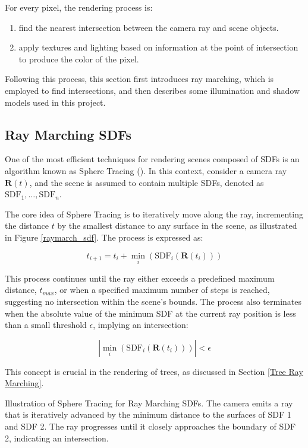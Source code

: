 For every pixel, the rendering process is:
\begin{enumerate}
    \item find the nearest intersection between the camera ray and scene objects.
    \item apply textures and lighting based on information at the point of intersection to produce the color of the pixel.
\end{enumerate}

Following this process, this section first introduces ray marching, which is employed to find intersections, and then describes some illumination and shadow models used in this project.

\subsection{Ray Marching SDFs}
\label{Raymarching SDFs}

One of the most efficient techniques for rendering scenes composed of SDFs is an algorithm known as Sphere Tracing (). In this context, consider a camera ray $\mathbf{R}(t)$, and the scene is assumed to contain multiple SDFs, denoted as $\text{SDF}_1, \dots, \text{SDF}_n$.

The core idea of Sphere Tracing is to iteratively move along the ray, incrementing the distance $t$ by the smallest distance to any surface in the scene, as illustrated in Figure \ref{raymarch_sdf}. The process is expressed as:

\begin{equation}
    t_{i+1} = t_{i} + \min_i(\text{SDF}_i(\mathbf{R}(t_i)))
\end{equation}

This process continues until the ray either exceeds a predefined maximum distance, $t_{max}$, or when a specified maximum number of steps is reached, suggesting no intersection within the scene's bounds. The process also terminates when the absolute value of the minimum SDF at the current ray position is less than a small threshold $\epsilon$, implying an intersection:

\begin{equation}
|\min_{i}(\text{SDF}_i(\mathbf{R}(t_i)))| < \epsilon 
\end{equation}

This concept is crucial in the rendering of trees, as discussed in Section \ref{Tree Ray Marching}.

{Illustration of Sphere Tracing for Ray Marching SDFs. The camera emits a ray that is iteratively advanced by the minimum distance to the surfaces of SDF 1 and SDF 2. The ray progresses until it closely approaches the boundary of SDF 2, indicating an intersection.  }

